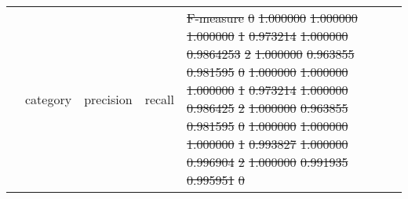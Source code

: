 \documentclass[
10pt, %
a4paper, %
oneside, %
headinclude,footinclude, %
] {book}%
\providecommand{\DIFadd}[1]{{\protect\color{blue}\uwave{#1}}} %
\providecommand{\DIFdel}[1]{{\protect\color{red}\sout{#1}}}                      %
\providecommand{\DIFaddbegin}{} %
\providecommand{\DIFdelbegin}{} %
\providecommand{\DIFdelend}{} %
\providecommand{\DIFaddFL}[1]{\DIFadd{#1}} %
\providecommand{\DIFdelFL}[1]{\DIFdel{#1}} %
\providecommand{\DIFaddbeginFL}{} %
\providecommand{\DIFaddendFL}{} %
\providecommand{\DIFdelbeginFL}{} %
\providecommand{\DIFdelendFL}{} %
\begin{document}
\DIFdelbegin %
\DIFdelend \DIFaddbegin \begin{table}[H]
   \DIFaddendFL 

    \DIFdelbeginFL %
\DIFdelendFL \DIFaddbeginFL \begin{tabular}{lllll}
    \DIFaddFL{tokenization }& \DIFaddendFL category & precision & recall & \DIFdelbeginFL \DIFdelFL{F-measure }%
\DIFdelFL{0 }%
\DIFdelFL{1.000000  }%
\DIFdelFL{1.000000  }%
\DIFdelFL{1.000000  }%
\DIFdelFL{1 }%
\DIFdelFL{0.973214  }%
\DIFdelFL{1.000000  }%
\DIFdelFL{0.9864253 }%
\DIFdelFL{2 }%
\DIFdelFL{1.000000  }%
\DIFdelFL{0.963855  }%
\DIFdelFL{0.981595 }%
\DIFdelFL{0 }%
\DIFdelFL{1.000000  }%
\DIFdelFL{1.000000  }%
\DIFdelFL{1.000000 }%
\DIFdelFL{1 }%
\DIFdelFL{0.973214  }%
\DIFdelFL{1.000000  }%
\DIFdelFL{0.986425 }%
\DIFdelFL{2 }%
\DIFdelFL{1.000000  }%
\DIFdelFL{0.963855  }%
\DIFdelFL{0.981595 }%
\DIFdelFL{0 }%
\DIFdelFL{1.000000 }%
\DIFdelFL{1.000000 }%
\DIFdelFL{1.000000 }%
\DIFdelFL{1 }%
\DIFdelFL{0.993827 }%
\DIFdelFL{1.000000 }%
\DIFdelFL{0.996904 }%
\DIFdelFL{2 }%
\DIFdelFL{1.000000 }%
\DIFdelFL{0.991935 }%
\DIFdelFL{0.995951 }%
\DIFdelFL{0 }%

\end{tabular}
\end{table}
\end{document}

